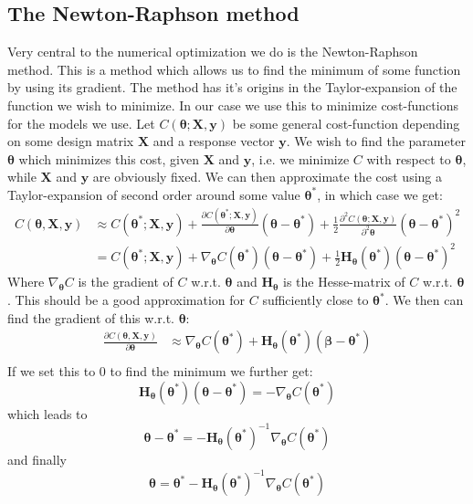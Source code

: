 \documentclass{article}
\begin{document}
\subsection{The Newton-Raphson method}
Very central to the numerical optimization we do is the Newton-Raphson method.
This is a method which allows us to find the minimum of some function by using
its gradient. The method has it's origins in the Taylor-expansion of the
function we wish to minimize. In our case we use this to minimize cost-functions
for the models we use. Let $C(\bm{\theta}; \bm{X}, \bm{y})$ be some general
cost-function depending on some design matrix $\bm{X}$ and a response vector
$\bm{y}$. We wish to find the parameter $\bm{\theta}$ which minimizes this cost, given
$\bm{X}$ and $\bm{y}$, i.e. we minimize $C$ with respect to $\bm{\theta}$, while
$\bm{X}$ and $\bm{y}$ are obviously fixed. We can then approximate the cost using a
Taylor-expansion of second order around some value $\bm{\theta}^*$, in which case
we get:
\begin{align*}
      C(\bm{\theta}, \bm{X}, \bm{y}) & \approx C(\bm{\theta}^*; \bm{X}, \bm{y}) + \frac{\partial C(\bm{\theta}^*; \bm{X}, \bm{y})}{\partial \bm{\theta}}(\bm{\theta} - \bm{\theta}^*) + \frac{1}{2} \frac{\partial^2 C(\bm{\theta}; \bm{X}, \bm{y})}{\partial^2 \bm{\theta}}(\bm{\theta} - \bm{\theta}^*)^2 \\
                                     & = C(\bm{\theta}^*; \bm{X}, \bm{y}) + \nabla_{\bm{\theta}} C(\bm{\theta}^*) (\bm{\theta} - \bm{\theta}^*) + \frac{1}{2} \bm{H}_{\bm{\theta}}(\bm{\theta}^*) (\bm{\theta} - \bm{\theta}^*)^2
\end{align*}
Where $\nabla_{\bm{\theta}} C$ is the gradient of $C$ w.r.t. $\bm{\theta}$ and
$\bm{H}_{\bm{\theta}}$ is the Hesse-matrix of $C$ w.r.t.  $\bm{\theta}$. This
should be a good approximation for $C$ sufficiently close to $\bm{\theta}^*$. We
then can find the gradient of this w.r.t. $\bm{\theta}$:
\begin{align*}
      \frac{\partial C(\bm{\theta}, \bm{X}, \bm{y})}{\partial \bm{\theta}} & \approx
      \nabla_{\bm{\theta}} C(\bm{\theta}^*) + \bm{H}_{\bm{\theta}}(\bm{\theta}^*)(\bm{\beta} - \bm{\theta}^*) \\
\end{align*}
If we set this to $0$ to find the minimum we further get:
$$\bm{H}_{\bm{\theta}}(\bm{\theta}^*) (\bm{\theta} - \bm{\theta}^*) = -\nabla_{\bm{\theta}} C(\bm{\theta}^*)$$
which leads to
$$\bm{\theta} - \bm{\theta}^* = - \bm{H}_{\bm{\theta}}(\bm{\theta}^*)^{-1} \nabla_{\bm{\theta}} C(\bm{\theta}^*)$$
and finally
$$\bm{\theta} = \bm{\theta}^* - \bm{H}_{\bm{\theta}}(\bm{\theta}^*)^{-1} \nabla_{\bm{\theta}} C(\bm{\theta}^*)$$
\end{document}
